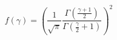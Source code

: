 \begin{equation}
f(\gamma )=\left(\frac{1}{\sqrt{\pi}}\frac{\Gamma (\frac{\gamma +1}{2})}
{\Gamma (\frac{\gamma}{2}+1)}\right)^2
\label{fac}
\end{equation}

